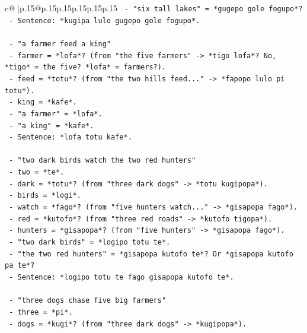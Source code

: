 \documentclass{article}
\begin{document}
{\begin{supertabular}{c@{$\;$}|p{.15\linewidth}@{}p{.15\linewidth}p{.15\linewidth}p{.15\linewidth}p{.15\linewidth}p{.15\linewidth}}
{{{\texttt{                {-} "six tall lakes" = *gugepo gole fogupo*?} \\
\texttt{                {-} Sentence: *kugipa lulo gugepo gole fogupo*.} \\
\\ 
\texttt{              {-} "a farmer feed a king"} \\
\texttt{                {-} farmer = *lofa*? (from "the five farmers" {-}> *tigo lofa*? No, *tigo* = the five? *lofa* = farmers?).} \\
\texttt{                {-} feed = *totu*? (from "the two hills feed..." {-}> *fapopo lulo pi totu*).} \\
\texttt{                {-} king = *kafe*.} \\
\texttt{                {-} "a farmer" = *lofa*.} \\
\texttt{                {-} "a king" = *kafe*.} \\
\texttt{                {-} Sentence: *lofa totu kafe*.} \\
\\ 
\texttt{              {-} "two dark birds watch the two red hunters"} \\
\texttt{                {-} two = *te*.} \\
\texttt{                {-} dark = *totu*? (from "three dark dogs" {-}> *totu kugipopa*).} \\
\texttt{                {-} birds = *logi*.} \\
\texttt{                {-} watch = *fago*? (from "five hunters watch..." {-}> *gisapopa fago*).} \\
\texttt{                {-} red = *kutofo*? (from "three red roads" {-}> *kutofo tigopa*).} \\
\texttt{                {-} hunters = *gisapopa*? (from "five hunters" {-}> *gisapopa fago*).} \\
\texttt{                {-} "two dark birds" = *logipo totu te*.} \\
\texttt{                {-} "the two red hunters" = *gisapopa kutofo te*? Or *gisapopa kutofo pa te*?} \\
\texttt{                {-} Sentence: *logipo totu te fago gisapopa kutofo te*.} \\
\\ 
\texttt{              {-} "three dogs chase five big farmers"} \\
\texttt{                {-} three = *pi*.} \\
\texttt{                {-} dogs = *kugi*? (from "three dark dogs" {-}> *kugipopa*).} \\
}}}
\end{supertabular}}
\end{document}
